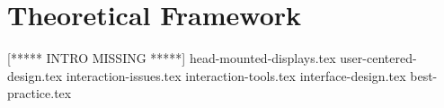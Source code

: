 \chapter{Theoretical Framework}
\label{theory}
[***** INTRO MISSING *****]
{head-mounted-displays.tex}
{user-centered-design.tex}
{interaction-issues.tex}
{interaction-tools.tex}
{interface-design.tex}
{best-practice.tex}
